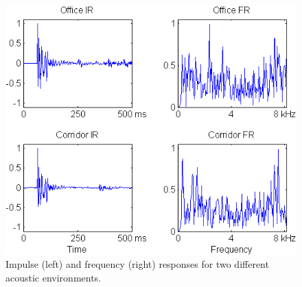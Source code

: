 \begin{figure}
	\centering
	\includegraphics[width=1\linewidth]{Figs/Room_IRs.png}
	\caption{Impulse (left) and frequency (right) responses for two different acoustic environments.}
	\label{fig::Room_IRs}
\end{figure}



